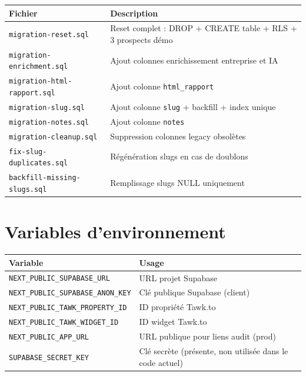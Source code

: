 \documentclass[11pt,a4paper]{report}
\begin{document}
\begin{table}[h]
\centering
\small
\begin{tabular}{@{}lp{9cm}@{}}
\toprule
\textbf{Fichier} & \textbf{Description} \\
\midrule
\texttt{migration-reset.sql} & Reset complet : DROP + CREATE table + RLS + 3 prospects démo \\
\texttt{migration-enrichment.sql} & Ajout colonnes enrichissement entreprise et IA \\
\texttt{migration-html-rapport.sql} & Ajout colonne \texttt{html\_rapport} \\
\texttt{migration-slug.sql} & Ajout colonne \texttt{slug} + backfill + index unique \\
\texttt{migration-notes.sql} & Ajout colonne \texttt{notes} \\
\texttt{migration-cleanup.sql} & Suppression colonnes legacy obsolètes \\
\texttt{fix-slug-duplicates.sql} & Régénération slugs en cas de doublons \\
\texttt{backfill-missing-slugs.sql} & Remplissage slugs NULL uniquement \\
\bottomrule
\end{tabular}
\end{table}

\chapter{Variables d'environnement}

\begin{table}[h]
\centering
\begin{tabular}{@{}lp{8cm}@{}}
\toprule
\textbf{Variable} & \textbf{Usage} \\
\midrule
\texttt{NEXT\_PUBLIC\_SUPABASE\_URL} & URL projet Supabase \\
\texttt{NEXT\_PUBLIC\_SUPABASE\_ANON\_KEY} & Clé publique Supabase (client) \\
\texttt{NEXT\_PUBLIC\_TAWK\_PROPERTY\_ID} & ID propriété Tawk.to \\
\texttt{NEXT\_PUBLIC\_TAWK\_WIDGET\_ID} & ID widget Tawk.to \\
\texttt{NEXT\_PUBLIC\_APP\_URL} & URL publique pour liens audit (prod) \\
\texttt{SUPABASE\_SECRET\_KEY} & Clé secrète (présente, non utilisée dans le code actuel) \\
\bottomrule
\end{tabular}
\end{table}
\end{document}
